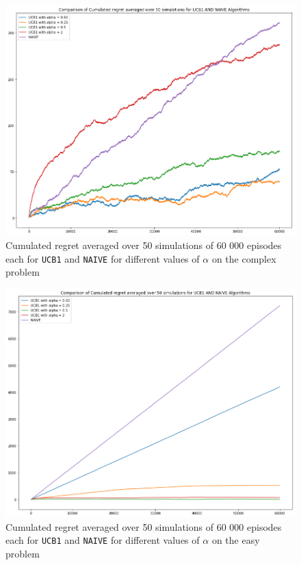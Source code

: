 \documentclass[11pt]{article}
\numberwithin{figure}{section} %
\begin{document}
\begin{figure}[H]
		\centering
		\includegraphics[width=1\linewidth]{images/preli_complex}
		\caption{Cumulated regret averaged over 50 simulations of 60 000 episodes each for \texttt{UCB1} and \texttt{NAIVE} for different values of $\alpha$ on the complex problem}
		\label{fig:UCB1_v_NAIVE_complex}
\end{figure}

\begin{figure}[H]
		\centering
		\includegraphics[width=1\linewidth]{images/preli_easy}
		\caption{Cumulated regret averaged over 50 simulations of 60 000 episodes each for \texttt{UCB1} and \texttt{NAIVE} for different values of $\alpha$ on the easy problem}
		\label{fig:UCB1_v_NAIVE_easy}
\end{figure}
\end{document}
